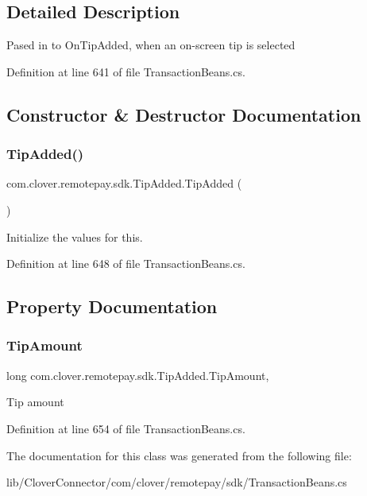 \subsection{Detailed Description}
Pased in to On\+Tip\+Added, when an on-\/screen tip is selected 



Definition at line 641 of file Transaction\+Beans.\+cs.



\subsection{Constructor \& Destructor Documentation}
\mbox{\label{classcom_1_1clover_1_1remotepay_1_1sdk_1_1_tip_added_a1fcf7127a24af8673bfd311ddc81f425}} 
\subsubsection{\texorpdfstring{Tip\+Added()}{TipAdded()}}
{\footnotesize\ttfamily com.\+clover.\+remotepay.\+sdk.\+Tip\+Added.\+Tip\+Added (\begin{DoxyParamCaption}{ }\end{DoxyParamCaption})}

Initialize the values for this. 

Definition at line 648 of file Transaction\+Beans.\+cs.



\subsection{Property Documentation}
\mbox{\label{classcom_1_1clover_1_1remotepay_1_1sdk_1_1_tip_added_a837fb32742e50ee6b7690da34cbb6c33}} 
\subsubsection{\texorpdfstring{Tip\+Amount}{TipAmount}}
{\footnotesize\ttfamily long com.\+clover.\+remotepay.\+sdk.\+Tip\+Added.\+Tip\+Amount\hspace{0.3cm}{\ttfamily [get]}, {\ttfamily [set]}}



Tip amount 



Definition at line 654 of file Transaction\+Beans.\+cs.



The documentation for this class was generated from the following file\+:\begin{DoxyCompactItemize}
\item 
lib/\+Clover\+Connector/com/clover/remotepay/sdk/Transaction\+Beans.\+cs\end{DoxyCompactItemize}
